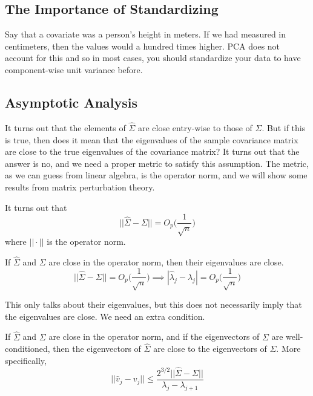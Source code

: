 \subsection{The Importance of Standardizing} 

  Say that a covariate was a person's height in meters. If we had measured in centimeters, then the values would a hundred times higher. PCA does not account for this and so in most cases, you should standardize your data to have component-wise unit variance before. 

\subsection{Asymptotic Analysis}

  It turns out that the elements of $\hat{\Sigma}$ are close entry-wise to those of $\Sigma$. But if this is true, then does it mean that the eigenvalues of the sample covariance matrix are close to the true eigenvalues of the covariance matrix? It turns out that the answer is no, and we need a proper metric to satisfy this assumption. The metric, as we can guess from linear algebra, is the operator norm, and we will show some results from matrix perturbation theory. 

  \begin{lemma}[]
    It turns out that 
    \begin{equation}
      ||\hat{\Sigma} - \Sigma|| = O_p \bigg( \frac{1}{\sqrt{n}} \bigg)
    \end{equation}
    where $|| \cdot ||$ is the operator norm. 
  \end{lemma}

  \begin{theorem}
    If $\hat{\Sigma}$ and $\Sigma$ are close in the operator norm, then their eigenvalues are close. 
    \begin{equation}
      ||\hat{\Sigma} - \Sigma|| = O_p \bigg( \frac{1}{\sqrt{n}} \bigg) \implies |\hat{\lambda}_j - \lambda_j| = O_p \bigg( \frac{1}{\sqrt{n}} \bigg) 
    \end{equation}
  \end{theorem}

  This only talks about their eigenvalues, but this does not necessarily imply that the eigenvalues are close. We need an extra condition. 

  \begin{theorem}
    If $\hat{\Sigma}$ and $\Sigma$ are close in the operator norm, and if the eigenvectors of $\Sigma$ are well-conditioned, then the eigenvectors of $\hat{\Sigma}$ are close to the eigenvectors of $\Sigma$. More specifically, 
    \begin{equation}
      ||\hat{v}_j - v_j|| \leq \frac{2^{3/2} ||\hat{\Sigma} - \Sigma||}{\lambda_j - \lambda_{j+1}}
    \end{equation}
  \end{theorem}



